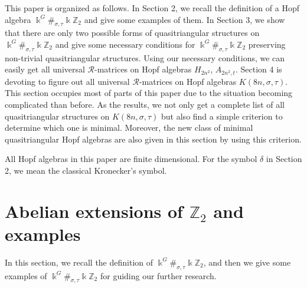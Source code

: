 \documentclass[a4paper,11pt]{amsart}
\numberwithin{equation}{section}
\begin{document}
This paper is organized as follows. In Section 2, we recall the definition of a  Hopf algebra $\Bbbk^G\#_{\sigma,\tau}\Bbbk \mathbb{Z}_{2}$ and give some examples of them. In Section 3, we show that there are only two possible forms of quasitriangular structures on $\Bbbk^G\#_{\sigma,\tau}\Bbbk \mathbb{Z}_{2}$ and give some necessary conditions for $\Bbbk^G\#_{\sigma,\tau}\Bbbk \mathbb{Z}_{2}$ preserving non-trivial quasitriangular structures. Using our necessary conditions, we can easily get all universal $\mathcal{R}$-matrices on Hopf algebras $H_{2n^2}$, $A_{2n^2,t}$. Section 4 is devoting to figure out all universal $\mathcal{R}$-matrices on Hopf algebras $K(8n,\sigma,\tau)$. This section occupies most of parts of this paper due to the situation becoming complicated than before. As the results, we not only get a complete list of all quasitriangular structures on $K(8n,\sigma,\tau)$ but also find a simple criterion to determine which one is minimal. Moreover, the new class of minimal quasitriangular Hopf algebras are also given in this section by using this criterion.

 All Hopf algebras in this paper are finite dimensional. For the symbol $\delta$ in Section 2, we mean the classical Kronecker's symbol.

\section{Abelian extensions of $\mathbb{Z}_{2}$ and examples}
In this section, we recall the definition of $\Bbbk^G\#_{\sigma,\tau}\Bbbk \mathbb{Z}_{2}$, and then we give some examples of $\Bbbk^G\#_{\sigma,\tau}\Bbbk \mathbb{Z}_{2}$ for guiding our further research.
\end{document}

